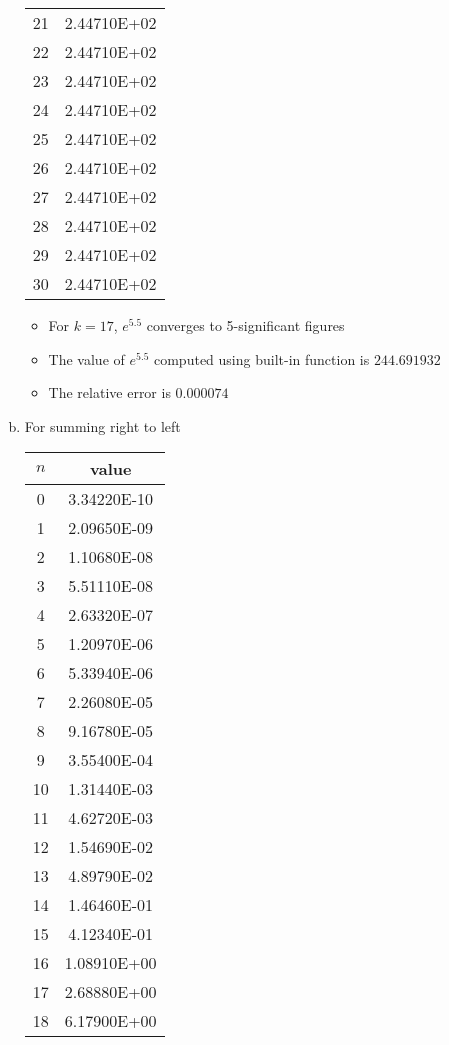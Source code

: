 \begin{enumerate}[(a)]
\begin{table}[H]
\begin{tabular}{c|c}
					21 & 2.44710E+02 \\
					22 & 2.44710E+02 \\
					23 & 2.44710E+02 \\
					24 & 2.44710E+02 \\
					25 & 2.44710E+02 \\
					26 & 2.44710E+02 \\
					27 & 2.44710E+02 \\
					28 & 2.44710E+02 \\
					29 & 2.44710E+02 \\
					30 & 2.44710E+02
				\end{tabular}
			\end{table}
			\begin{itemize}
				\item For $k=17$, $e^{5.5}$ converges to 5-significant figures
				\item The value of $e^{5.5}$ computed using built-in function is $244.691932$
				\item The relative error is $0.000074$
			\end{itemize}
	\item For summing right to left
			\begin{table}[H]
			\centering
				\begin{tabular}{c|c}
					$n$ & value \\
					\hline
					0 & 3.34220E-10 \\
					1 & 2.09650E-09 \\
					2 & 1.10680E-08 \\
					3 & 5.51110E-08 \\
					4 & 2.63320E-07 \\
					5 & 1.20970E-06 \\
					6 & 5.33940E-06 \\
					7 & 2.26080E-05 \\
					8 & 9.16780E-05 \\
					9 & 3.55400E-04 \\
					10 & 1.31440E-03 \\
					11 & 4.62720E-03 \\
					12 & 1.54690E-02 \\
					13 & 4.89790E-02 \\
					14 & 1.46460E-01 \\
					15 & 4.12340E-01 \\
					16 & 1.08910E+00 \\
					17 & 2.68880E+00 \\
					18 & 6.17900E+00 \\

\end{tabular}
\end{table}
\end{enumerate}
